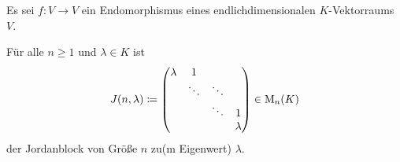 \begin{lemma}
  Es sei $f \colon V \to V$ ein Endomorphismus eines endlichdimensionalen $K$-Vek\-tor\-raums $V$.
\end{lemma}


\begin{notation}
  Für alle $n \geq 1$ und $\lambda \in K$ ist
  \[
    J(n, \lambda)
    \coloneqq
    \begin{pmatrix}
      \lambda & 1       &         &         \\
              & \ddots  & \ddots  &         \\
              &         & \ddots  & 1       \\
              &         &         & \lambda
    \end{pmatrix}
    \in \mathrm{M}_n(K)
  \]
  der Jordanblock von Größe $n$ zu(m Eigenwert) $\lambda$.
\end{notation}


